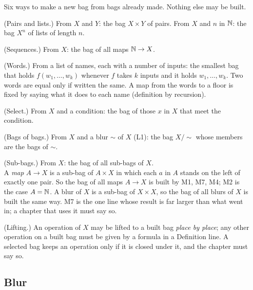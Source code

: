Six ways to make a new bag from bags already made. Nothing else may be built.
\begin{lines}
\item[\lab{M1}] (Pairs and lists.) From $X$ and $Y$: the bag $X \times Y$ of pairs. From $X$ and $n$ in $\mathbb{N}$: the bag $X^n$ of lists of length $n$.
\item[\lab{M2}] (Sequences.) From $X$: the bag of all maps $\mathbb{N} \to X$.
\item[\lab{M3}] (Words.) From a list of names, each with a number of inputs: the smallest bag that holds $f(w_1, \dots, w_k)$ whenever $f$ takes $k$ inputs and it holds $w_1, \dots, w_k$. Two words are equal only if written the same. A map from the words to a floor is fixed by saying what it does to each name (definition by recursion).
\item[\lab{M4}] (Select.) From $X$ and a condition: the bag of those $x$ in $X$ that meet the condition.
\item[\lab{M5}] (Bags of bags.) From $X$ and a blur $\sim$ of $X$ (L1): the bag $X/{\sim}$ whose members are the bags of $\sim$.
\item[\lab{M7}] (Sub-bags.) From $X$: the bag of all sub-bags of $X$. \\
A \emph{map} $A \to X$ is a sub-bag of $A \times X$ in which each $a$ in $A$ stands on the left of exactly one pair. So the bag of all maps $A \to X$ is built by M1, M7, M4; M2 is the case $A = \mathbb{N}$. A blur of $X$ is a sub-bag of $X \times X$, so the bag of all blurs of $X$ is built the same way. M7 is the one line whose result is far larger than what went in; a chapter that uses it must say so.
\end{lines}
\begin{lines}
\item[\lab{M6}] (Lifting.) An operation of $X$ may be lifted to a built bag \emph{place by place}; any other operation on a built bag must be given by a formula in a Definition line. A selected bag keeps an operation only if it is closed under it, and the chapter must say so.
\end{lines}

\subsection*{Blur}

